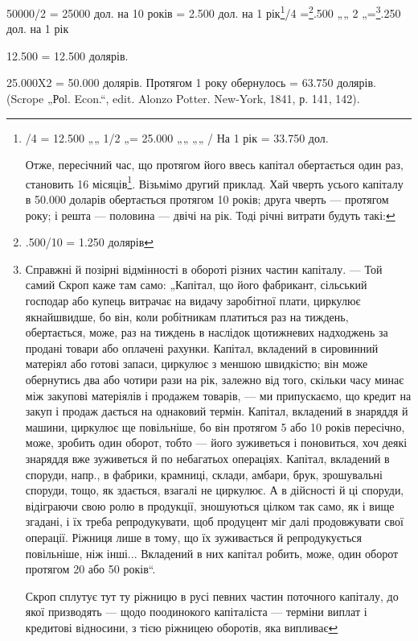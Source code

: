 50000/2 = 25000 дол. на 10 років = 2.500 дол. на 1 рік\footnote{
/4 = 12.500 „„    1/2 „= 25.000 „„ „„ / На 1 рік = 33.750 дол.

Отже, пересічний час, що протягом його ввесь капітал обертається
один раз, становить 16 місяців\footnote*{
В обчисленні є помилка. Пересічний час, що протягом його обертається ввесь
капітал, становить не 16 місяців, а 17,16 місяців. Ред.
}. Візьмімо другий приклад. Хай чверть
усього капіталу в 50.000 доларів обертається протягом 10 років; друга
чверть — протягом року; і решта — половина — двічі на рік. Тоді річні витрати
будуть такі:
}/4 =\footnote{
.500/10 = 1.250 долярів
}.500 „„    2 „=\footnote{
Справжні й позірні відмінності в обороті різних частин капіталу. —
Той самий Скроп каже там само: „Капітал, що його фабрикант, сільський
господар або купець витрачає на видачу заробітної плати, циркулює якнайшвидше,
бо він, коли робітникам платиться раз на тиждень, обертається,
може, раз на тиждень в наслідок щотижневих надходжень за
продані товари або оплачені рахунки. Капітал, вкладений в сировинний
матеріял або готові запаси, циркулює з меншою швидкістю; він може
обернутись два або чотири рази на рік, залежно від того, скільки
часу минає між закупові матеріялів і продажем товарів, — ми припускаємо,
що кредит на закуп і продаж дається на однаковий термін. Капітал, вкладений
в знаряддя й машини, циркулює ще повільніше, бо він протягом
5 або 10 років пересічно, може, зробить один оборот, тобто — його зуживеться
і поновиться, хоч деякі знаряддя вже зуживеться й по
небагатьох операціях. Капітал, вкладений в споруди, напр., в фабрики,
крамниці, склади, амбари, брук, зрошувальні споруди, тощо, як здається,
взагалі не циркулює. А в дійсності й ці споруди, відіграючи
свою ролю в продукції, зношуються цілком так само, як і вище згадані,
і їх треба репродукувати, щоб продуцент міг далі продовжувати
свої операції. Ріжниця лише в тому, що їх зуживається й репродукується
повільніше, ніж інші... Вкладений в них капітал робить, може,
один оборот протягом 20 або 50 років“.

Скроп сплутує тут ту ріжницю в русі певних частин поточного
капіталу, до якої призводять — щодо поодинокого капіталіста — терміни
виплат і кредитові відносини, з тією ріжницею оборотів, яка випливає
}.250 дол. на 1    рік

12.500 = 12.500 долярів.

25.000X2 = 50.000 долярів.
Протягом 1 року обернулось = 63.750 долярів.
(Scrope „Роl. Econ.“, edit. Alonzo Potter. New-York, 1841, р. 141, 142).